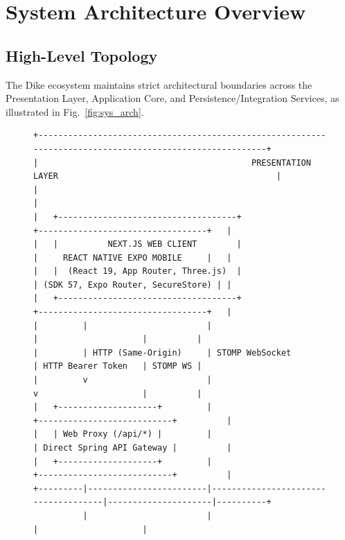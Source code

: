 \documentclass[conference,10pt,a4paper]{IEEEtran}
\begin{document}
\section{System Architecture Overview}

\subsection{High-Level Topology}
The Dike ecosystem maintains strict architectural boundaries across the Presentation Layer, Application Core, and Persistence/Integration Services, as illustrated in Fig.~\ref{fig:sys_arch}.

\begin{figure}[!t]
\centering
\begin{lstlisting}[basicstyle=\ttfamily\fontsize{6pt}{7pt}\selectfont,frame=single,numbers=none]
+---------------------------------------------------------------------------------------------------------+
|                                           PRESENTATION LAYER                                            |
|                                                                                                         |
|   +------------------------------------+                         +----------------------------------+   |
|   |          NEXT.JS WEB CLIENT        |                         |     REACT NATIVE EXPO MOBILE     |   |
|   |  (React 19, App Router, Three.js)  |                         | (SDK 57, Expo Router, SecureStore) | |
|   +------------------------------------+                         +----------------------------------+   |
|         |                        |                                     |                     |          |
|         | HTTP (Same-Origin)     | STOMP WebSocket                     | HTTP Bearer Token   | STOMP WS |
|         v                        |                                     v                     |          |
|   +--------------------+         |                               +---------------------------+          |
|   | Web Proxy (/api/*) |         |                               | Direct Spring API Gateway |          |
|   +--------------------+         |                               +---------------------------+          |
+---------|------------------------|-------------------------------------|---------------------|----------+
          |                        |                                     |                     |

\end{lstlisting}
\end{figure}
\end{document}

